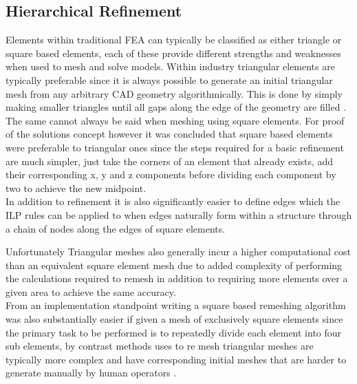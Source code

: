 \subsection{Hierarchical Refinement}
\noindent
Elements within traditional FEA can typically be classified as either triangle or square based elements, each of these provide different strengths and weaknesses when used                                                                                                                                                                                                                                                                                                                                                                                                                                                                         to mesh and solve models. Within industry triangular elements are typically preferable since it is always possible to generate an initial triangular mesh from any arbitrary CAD geometry algorithmically. This is done by simply making smaller triangles until all gaps along the edge of the geometry are filled \cite{DelaunyTriangles}. The same cannot always be said  when meshing using square elements. For proof of the solutions concept however it was concluded that square based elements were preferable to triangular ones since the steps required for a basic refinement are much simpler, just take the corners of an element that already exists, add their corresponding x, y and z components before dividing each component by two to achieve the new midpoint. \\ 

\noindent
In addition to refinement it is also significantly easier to define edges which the ILP rules can be applied to when edges naturally form within a structure through a chain of nodes along the edges of square elements.


\noindent
Unfortunately Triangular meshes also generally incur a higher computational cost than an equivalent square element mesh due to added complexity of performing the calculations required to remesh in addition to requiring more elements over a given area to achieve the same accuracy. \\

\noindent
From an implementation standpoint writing a square based remeshing algorithm was also substantially easier if given a mesh of exclusively square elements since the primary task to be performed is to repeatedly divide each element into four sub elements, by contrast methods uses to re mesh triangular meshes are typically more complex and have corresponding initial meshes that are harder to generate manually by human operators \cite{HandMeshing}. \\ 



